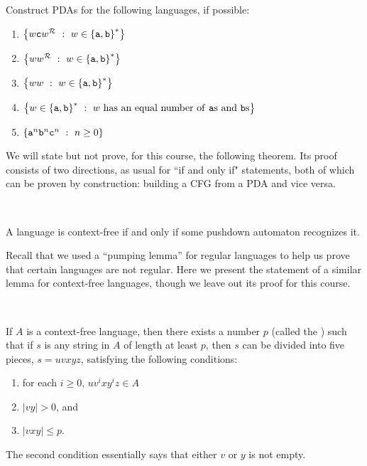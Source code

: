 \documentclass[twoside,letterpaper,openany]{book}
\begin{document}
\begin{exer}
Construct PDAs for the following languages, if possible:
\begin{enumerate}
\item $\left\lbrace w\texttt{c}w^{\mathcal{R}}\ :\  w \in \left\lbrace \texttt{a}, \texttt{b} \right\rbrace^{*}  \right\rbrace$
\item $\left\lbrace ww^{\mathcal{R}}\ :\  w \in \left\lbrace \texttt{a}, \texttt{b} \right\rbrace^{*}  \right\rbrace$
\item $\left\lbrace w{w}\ :\  w \in \left\lbrace \texttt{a}, \texttt{b} \right\rbrace^{*}  \right\rbrace$
\item $\left\lbrace w \in \left\lbrace {\texttt{a}}, {\texttt{b}} \right\rbrace^{*}\ :\ w~\textrm{has an equal number of {\texttt{a}}{s} and {\texttt{b}}{s}} \right\rbrace$
\item $\left\lbrace \texttt{a}^n \texttt{b}^n \texttt{c}^n\ :\  n \geq 0  \right\rbrace$
\end{enumerate}
\end{exer}

\begin{discussion}
We will state but not prove, for this course, the following theorem. Its proof consists of two directions, as usual for ``if and only if" statements, both of which can be proven by construction: building a CFG from a PDA and vice versa.
\end{discussion}

~

\begin{axiom}
A language is context-free if and only if some pushdown automaton recognizes it.
\end{axiom}

\begin{discussion}
Recall that we used a ``pumping lemma'' for regular languages to help us prove that certain languages are not regular. Here we present the statement of a similar lemma for context-free languages, though we leave out its proof for this course.
\end{discussion}

~

\begin{axiom}
If $A$ is a context-free language, then there exists a number $p$ (called the ) such that if $s$ is any string in $A$ of length at least $p$, then $s$ can be divided into five pieces, $s = uvxyz$, satisfying the following conditions:
\begin{enumerate}
\item for each $i \geq 0$, $uv^ixy^iz \in A$
\item $|vy| > 0$, and
\item $|vxy| \leq p$.
\end{enumerate}
The second condition essentially says that either $v$ or $y$ is not empty.
\end{axiom}
\end{document}
